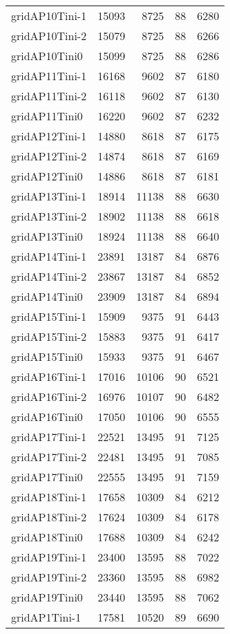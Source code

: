 \begin{longtable}{lrrrr}
gridAP10Tini-1 & 15093 & 8725 & 88 & 6280 \\
gridAP10Tini-2 & 15079 & 8725 & 88 & 6266 \\
gridAP10Tini0 & 15099 & 8725 & 88 & 6286 \\
gridAP11Tini-1 & 16168 & 9602 & 87 & 6180 \\
gridAP11Tini-2 & 16118 & 9602 & 87 & 6130 \\
gridAP11Tini0 & 16220 & 9602 & 87 & 6232 \\
gridAP12Tini-1 & 14880 & 8618 & 87 & 6175 \\
gridAP12Tini-2 & 14874 & 8618 & 87 & 6169 \\
gridAP12Tini0 & 14886 & 8618 & 87 & 6181 \\
gridAP13Tini-1 & 18914 & 11138 & 88 & 6630 \\
gridAP13Tini-2 & 18902 & 11138 & 88 & 6618 \\
gridAP13Tini0 & 18924 & 11138 & 88 & 6640 \\
gridAP14Tini-1 & 23891 & 13187 & 84 & 6876 \\
gridAP14Tini-2 & 23867 & 13187 & 84 & 6852 \\
gridAP14Tini0 & 23909 & 13187 & 84 & 6894 \\
gridAP15Tini-1 & 15909 & 9375 & 91 & 6443 \\
gridAP15Tini-2 & 15883 & 9375 & 91 & 6417 \\
gridAP15Tini0 & 15933 & 9375 & 91 & 6467 \\
gridAP16Tini-1 & 17016 & 10106 & 90 & 6521 \\
gridAP16Tini-2 & 16976 & 10107 & 90 & 6482 \\
gridAP16Tini0 & 17050 & 10106 & 90 & 6555 \\
gridAP17Tini-1 & 22521 & 13495 & 91 & 7125 \\
gridAP17Tini-2 & 22481 & 13495 & 91 & 7085 \\
gridAP17Tini0 & 22555 & 13495 & 91 & 7159 \\
gridAP18Tini-1 & 17658 & 10309 & 84 & 6212 \\
gridAP18Tini-2 & 17624 & 10309 & 84 & 6178 \\
gridAP18Tini0 & 17688 & 10309 & 84 & 6242 \\
gridAP19Tini-1 & 23400 & 13595 & 88 & 7022 \\
gridAP19Tini-2 & 23360 & 13595 & 88 & 6982 \\
gridAP19Tini0 & 23440 & 13595 & 88 & 7062 \\
gridAP1Tini-1 & 17581 & 10520 & 89 & 6690 \\

\end{longtable}
